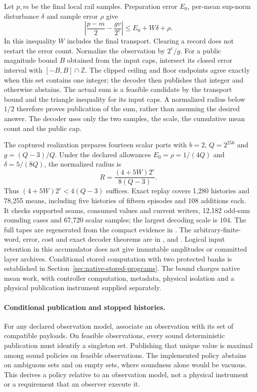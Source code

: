 Let $p,m$ be the final local rail samples. Preparation error $E_0$,
per-mean sup-norm disturbance $\delta$ and sample error $\rho$ give
\[
 \left|\frac{p-m}{2}-\frac{g v}{2^e}\right|
 \leq E_0+W\delta+\rho.
\]
In this inequality $W$ includes the final transport. Clearing a record
does not restart the error count. Normalize the observation by $2^e/g$.
For a public magnitude bound $B$ obtained from the input caps, intersect its
closed error interval with $[-B,B]\cap\mathbb Z$. The clipped ceiling and
floor endpoints agree exactly when this set contains one integer; the
decoder then publishes that integer and otherwise abstains. The actual
sum is a feasible candidate by the transport bound and the triangle
inequality for its input caps. A normalized radius below $1/2$ therefore
proves publication of the sum, rather than assuming the desired answer.
The decoder uses only the two samples, the scale, the cumulative mean count
and the public cap.

The captured realization prepares fourteen scalar ports with $b=2$,
$Q=2^{256}$ and $g=(Q-3)/Q$. Under the declared allowances
$E_0=\rho=1/(4Q)$ and $\delta=5/(8Q)$, the normalized radius is
\[
 R=\frac{(4+5W)2^e}{8(Q-3)}.
\]
Thus $(4+5W)2^e<4(Q-3)$ suffices. Exact replay covers 1,280 histories
and 78,255 means, including five histories of fifteen episodes and 108
additions each. It checks supported seams, consumed values and current
writers, 12,182 odd-sum rounding cases and 67,720 scalar samples; the
largest decoding scale is $104$. The full tapes are regenerated from the
compact evidence in .
The arbitrary-finite-word, error, cost and exact decoder theorems are in
,
 and
. Logical input retention in this accumulator
does not give immutable amplitudes or committed layer archives. Conditional
stored computation with two protected banks is established in
Section~\ref{sec:native-stored-programs}. The bound
charges native mean work, with controller computation, metadata, physical
isolation and a physical publication instrument supplied separately.

\paragraph{Conditional publication and stopped histories.}
For any declared observation model, associate an observation with its set
of compatible payloads. On feasible observations, every sound deterministic
publication must identify a singleton set. Publishing that unique value
is maximal among sound policies on feasible observations. The implemented
policy abstains on ambiguous sets and on empty sets, where soundness alone
would be vacuous.
This derives a policy relative to an observation model, not a physical
instrument or a requirement that an observer execute it.


